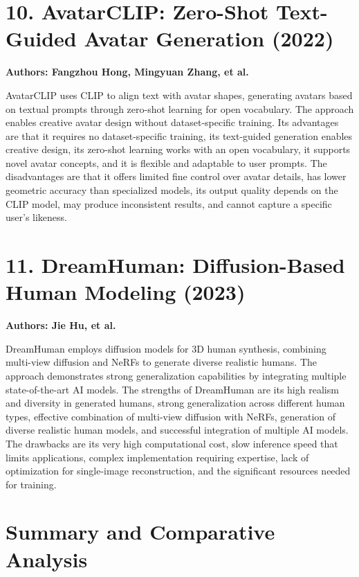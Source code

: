 \documentclass[12pt,a4paper,oneside]{report}
\begin{document}
\section*{10. AvatarCLIP: Zero-Shot Text-Guided Avatar Generation (2022)}

\textbf{Authors: Fangzhou Hong, Mingyuan Zhang, et al.}

AvatarCLIP uses CLIP to align text with avatar shapes, generating avatars based on textual prompts through zero-shot learning for open vocabulary. The approach enables creative avatar design without dataset-specific training. Its advantages are that it requires no dataset-specific training, its text-guided generation enables creative design, its zero-shot learning works with an open vocabulary, it supports novel avatar concepts, and it is flexible and adaptable to user prompts. The disadvantages are that it offers limited fine control over avatar details, has lower geometric accuracy than specialized models, its output quality depends on the CLIP model, may produce inconsistent results, and cannot capture a specific user's likeness.

\section*{11. DreamHuman: Diffusion-Based Human Modeling (2023)}

\textbf{Authors: Jie Hu, et al.}

DreamHuman employs diffusion models for 3D human synthesis, combining multi-view diffusion and NeRFs to generate diverse realistic humans. The approach demonstrates strong generalization capabilities by integrating multiple state-of-the-art AI models. The strengths of DreamHuman are its high realism and diversity in generated humans, strong generalization across different human types, effective combination of multi-view diffusion with NeRFs, generation of diverse realistic human models, and successful integration of multiple AI models. The drawbacks are its very high computational cost, slow inference speed that limits applications, complex implementation requiring expertise, lack of optimization for single-image reconstruction, and the significant resources needed for training.






\section{Summary and Comparative Analysis}
\end{document}
